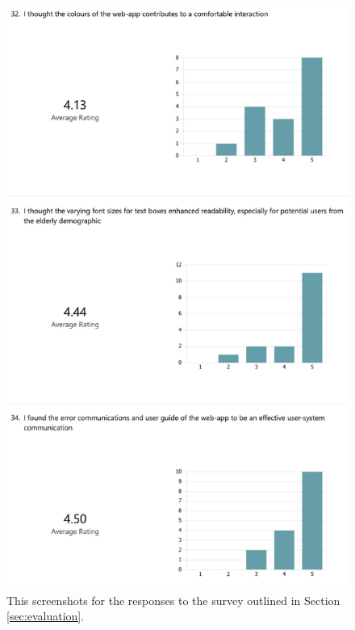 \documentclass{l4proj}
\begin{document}
\begin{appendices}
\begin{figure}[H]
    \centering
    \includegraphics[width=0.75\linewidth]{dissertation/images/eval-9.jpeg}    
    \caption{This screenshots for the responses to the survey outlined in Section \ref{sec:evaluation}.}
    \label{fig:eval-survey-9} 
\end{figure}


\end{appendices}
\end{document}
